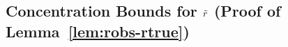 \subsection{Concentration Bounds for $\tilde{r}$ (Proof of Lemma~\ref{lem:robs-rtrue})}
\label{sec:concentration-proof}
